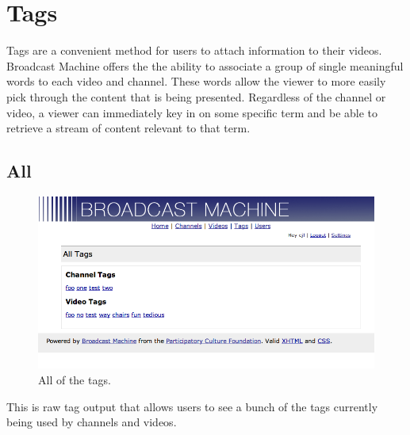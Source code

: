 \documentclass[a4paper,12pt]{report}
\begin{document}
\section{Tags}
Tags are a convenient method for users to attach information to their videos.
Broadcast Machine offers the the ability to associate a group of single meaningful words to each video and channel.
These words allow the viewer to more easily pick through the content that is being presented.
Regardless of the channel or video, a viewer can immediately key in on some specific term and be able to retrieve a stream of content relevant to that term.

\subsection{All}
\begin{figure}[h]
\begin{center}
\includegraphics[width=150mm]{./images/tagall.png}
\end{center}
\caption{All of the tags.}
\end{figure}

This is raw tag output that allows users to see a bunch of the tags currently being used by channels and videos.
\end{document}
